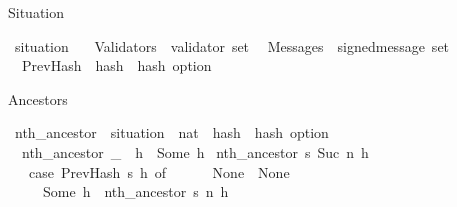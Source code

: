 \documentclass{beamer}
\begin{document}
\begin{frame}{Situation}

\isamarkupfalse%
\ situation\ {\isacharequal}\isanewline
\ \ Validators\ {\isacharcolon}{\isacharcolon}\ {\isachardoublequoteopen}validator\ set{\isachardoublequoteclose}\isanewline
\ \ Messages\ {\isacharcolon}{\isacharcolon}\ {\isachardoublequoteopen}signed{\isacharunderscore}message\ set{\isachardoublequoteclose}\isanewline
\ \ PrevHash\ {\isacharcolon}{\isacharcolon}\ {\isachardoublequoteopen}hash\ {\isasymRightarrow}\ hash\ option{\isachardoublequoteclose}%

\end{frame}


\renewcommand\isacharunderscore{\_}


\begin{frame}{Ancestors}

\isamarkupfalse%
\ nth{\isacharunderscore}ancestor\ {\isacharcolon}{\isacharcolon}\ {\isachardoublequoteopen}situation\ {\isasymRightarrow}\ nat\ {\isasymRightarrow}\ hash\ {\isasymRightarrow}\ hash\ option{\isachardoublequoteclose}\isanewline
{}\isanewline
\ \ {\isachardoublequoteopen}nth{\isacharunderscore}ancestor\ {\isacharunderscore}\ {}\ h\ {\isacharequal}\ Some\ h{\isachardoublequoteclose}\isanewline
{\isacharbar}\ {\isachardoublequoteopen}nth{\isacharunderscore}ancestor\ s\ {\isacharparenleft}Suc\ n{\isacharparenright}\ h\ {\isacharequal}\isanewline
\ \ \ {\isacharparenleft}case\ PrevHash\ s\ h\ of\isanewline
\ \ \ \ \ \ None\ {\isasymRightarrow}\ None\isanewline
\ \ \ \ {\isacharbar}\ Some\ h{\isacharprime}\ {\isasymRightarrow}\ nth{\isacharunderscore}ancestor\ s\ n\ h{\isacharprime}{\isacharparenright}{\isachardoublequoteclose}%

\end{frame}
\end{document}

